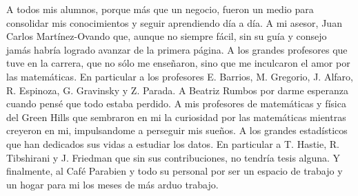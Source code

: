 \documentclass[../Main/Main.tex]{subfiles}
\begin{document}
A todos mis alumnos, porque más que un negocio, fueron un medio para consolidar mis conocimientos y seguir aprendiendo día a día. A mi asesor, Juan Carlos Martínez-Ovando que, aunque no siempre fácil, sin su guía y consejo jamás habría logrado avanzar de la primera página. A los grandes profesores que tuve en la carrera, que no sólo me enseñaron, sino que me inculcaron el amor por las matemáticas. En particular a los profesores E. Barrios, M. Gregorio, J. Alfaro, R. Espinoza, G. Gravinsky y Z. Parada. A Beatriz Rumbos por darme esperanza cuando pensé que todo estaba perdido. A mis profesores de matemáticas y física del Green Hills que sembraron en mi la curiosidad por las matemáticas mientras creyeron en mi, impulsandome a perseguir mis sueños. A los grandes estadísticos que han dedicados sus vidas a estudiar los datos. En particular a T. Hastie, R. Tibshirani y J. Friedman que sin sus contribuciones, no tendría tesis alguna. Y finalmente, al Café Parabien y todo su personal por ser un espacio de trabajo y un hogar para mi los meses de más arduo trabajo.
\thispagestyle{empty}
\end{document}
